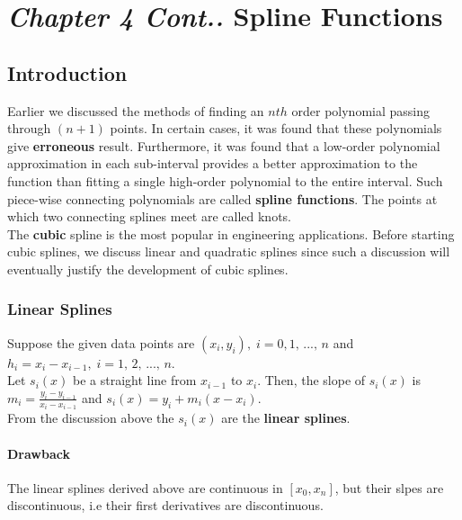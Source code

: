 \documentclass[aima203_lecturenotes_ku.tex]{subfiles}
\begin{document}
\chapter*{\textit{Chapter 4 Cont..} \hspace{15mm}  Spline Functions}
\section{Introduction}
Earlier we discussed the methods of finding an $nth$ order polynomial passing through $(n+1)$ points. In certain cases, it was found that these polynomials give \textbf{erroneous} result. Furthermore, it was found that a low-order polynomial approximation in each sub-interval provides a better approximation to the function than fitting a single high-order polynomial to the entire interval.
Such piece-wise connecting polynomials are called \textbf{spline functions}. The points at which two connecting splines meet are called knots.\\
The \textbf{cubic} spline is the most popular in engineering applications. Before starting cubic splines, we discuss linear and quadratic splines since such a discussion will eventually justify the development of cubic splines.

\subsection{Linear Splines}
Suppose the given data points are $(x_i,y_i), \; i=0,1,\, ..., \, n$ and  $h_i = x_i-x_{i-1} , \; i=1,\, 2, \, ..., \, n$. \\
Let $s_i(x)$ be a straight line from $x_{i-1}$ to $x_i$. Then, the slope of $s_i(x)$ is \\
$\displaystyle m_i = \frac{y_i - y_{i-1}}{x_i - x_{i-1}}$ and $s_i(x)= y_i + m_i(x-x_i)$. \\[2mm]
From the discussion above the $s_i(x)$ are the \textbf{linear splines}.

\subsubsection{Drawback}
The linear splines derived above are continuous in $[x_0, x_n]$, but their slpes are discontinuous, i.e their first derivatives are discontinuous.
\end{document}
